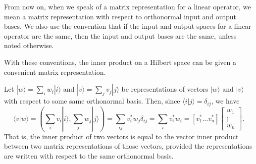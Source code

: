 
\begin{remark}
    From now on, when we speak of a matrix representation for a linear operator, we mean a matrix representation with respect to orthonormal input and output bases. We also use the convention that if the input and output spaces for a linear operator are the same, then the input and output bases are the same, unless noted otherwise.
\end{remark}

With these conventions, the inner product on a Hilbert space can be given a convenient matrix representation. 

Let $|w\rangle=\sum_{i} w_{i}|i\rangle$ and $|v\rangle=\sum_{j} v_{j}|j\rangle$ be representations of vectors $|w\rangle$ and $|v\rangle$ with respect to some same orthonormal basis. Then, since $\langle i | j\rangle=\delta_{i j}$, we have
$$
\langle v | w\rangle 
=\left(\sum_{i} v_{i}|i\rangle, \sum_{j} w_{j}|j\rangle\right)=\sum_{i j} v_{i}^{*} w_{j} \delta_{i j}
=\sum_{i} v_{i}^{*} w_{i}
=\left[v_{1}^{*} \ldots v_{n}^{*}\right]\left[\begin{array}{c}
w_{1} \\
\vdots \\
w_{n}
\end{array}\right].
$$
That is, the inner product of two vectors is equal to the vector inner product between two matrix representations of those vectors, provided the representations are written with respect to the same orthonormal basis. 


